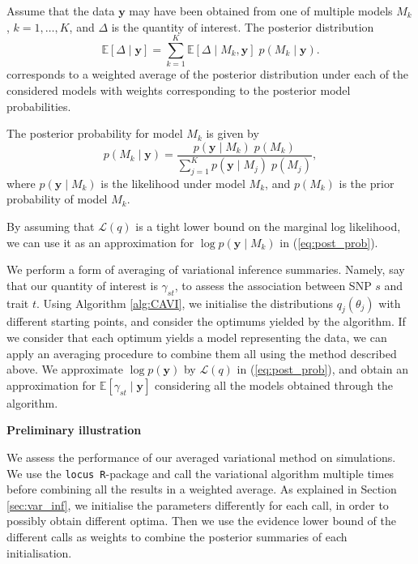 \documentclass[final]{beamer}
\begin{document}
\begin{multicols*}{3}
Assume that the data $\boldsymbol{y}$ may have been obtained from one of multiple models $M_k$, $k= 1,\ldots,K$, and $\Delta$ is the quantity of interest. The posterior distribution
\begin{equation}
\mathbb{E}\left[\Delta \mid \boldsymbol{y}\right] = \sum_{k=1}^K\mathbb{E}\left[\Delta \mid M_k, \boldsymbol{y}\right]\;p(M_k \mid \boldsymbol{y}).\label{eq:post_dist}
\end{equation}
corresponds to a weighted average of the posterior distribution under each of the considered models with weights corresponding to the posterior model probabilities.

The posterior probability for model $M_k$ is given by
\begin{equation}
p(M_k \mid \boldsymbol{y}) = \frac{p(\boldsymbol{y} \mid M_k)\; p(M_k)}{\sum_{j=1}^K p(\boldsymbol{y} \mid M_j)\; p(M_j)},
\label{eq:post_prob}
\end{equation}
where $p(\boldsymbol{y} \mid M_k)$ is the likelihood under model $M_k$, and $p(M_k)$ is the prior probability of model $M_k$.

By assuming that $\mathcal{L}(q)$ is a tight lower bound on the marginal log likelihood, we can use it as an approximation for $\log p(\boldsymbol{y}\mid M_k)$ in (\ref{eq:post_prob}).

We perform a form of averaging of variational inference summaries. Namely, say that our quantity of interest is $\gamma_{st}$, to assess the association between SNP $s$ and trait $t$. Using Algorithm \ref{alg:CAVI}, we initialise the distributions $q_j(\theta_j)$ with different starting points, and consider the optimums yielded by the algorithm. If we consider that each optimum yields a model representing the data, we can apply an averaging procedure to combine them all using the method described above. We approximate $\log p(\boldsymbol{y})$ by $\mathcal{L}(q)$ in (\ref{eq:post_prob}), and obtain an approximation for $\mathbb{E}\left[\gamma_{st}\mid \boldsymbol{y}\right]$ considering all the models obtained through the algorithm.

\vspace{1em}

\textbf{\large Preliminary illustration}

\vspace{1em}
We assess the performance of our averaged variational method on simulations. We use the \texttt{locus R}-package \citep{r_locus} and call the variational algorithm multiple times before combining all the results in a weighted average. As explained in Section \ref{sec:var_inf}, we initialise the parameters differently for each call, in order to possibly obtain different optima. Then we use the evidence lower bound of the different calls as weights to combine the posterior summaries of each initialisation. 


\end{multicols*}
\end{document}
